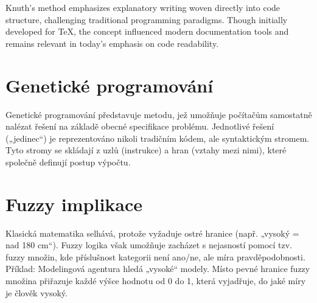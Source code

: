 \documentclass[12pt]{article}
\begin{document}
Knuth's method emphasizes explanatory writing woven directly into code structure, challenging traditional programming paradigms. 
Though initially developed for TeX, the concept influenced modern documentation tools and remains relevant in today's emphasis on 
code readability. \cite{knuth1984}

\section*{Genetické programování}
Genetické programování představuje metodu, jež umožňuje počítačům samostatně nalézat řešení na základě obecné specifikace problému. 
Jednotlivé řešení („jedinec“) je reprezentováno nikoli tradičním kódem, ale syntaktickým stromem. Tyto stromy se skládají z uzlů (instrukce) a 
hran (vztahy mezi nimi), které společně definují postup výpočtu. \cite{bromnik2024}

\section*{Fuzzy implikace}

Klasická matematika selhává, protože vyžaduje ostré hranice (např. „vysoký = nad 180 cm“). 
Fuzzy logika však umožňuje zacházet s nejasností pomocí tzv. fuzzy množin, kde příslušnost kategorii není ano/ne, ale míra pravděpodobnosti.
Příklad: Modelingová agentura hledá „vysoké“ modely. Místo pevné hranice fuzzy množina přiřazuje každé výšce hodnotu od 0 do 1, která vyjadřuje, 
do jaké míry je člověk vysoký. \cite{jirmusova2024}

\printbibliography
\end{document}
